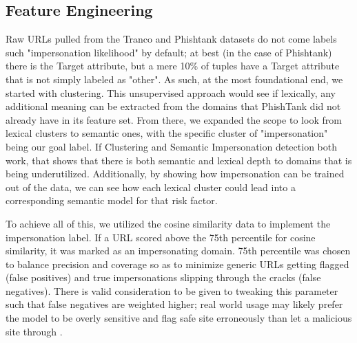 \documentclass[conference]{IEEEtran}
\begin{document}
\subsection{Feature Engineering}
Raw URLs pulled from the Tranco and Phishtank datasets do not come labels such "impersonation likelihood" by default; at best (in the case of Phishtank) there is the Target attribute, but a mere 10\% of tuples have a Target attribute that is not simply labeled as "other". 
As such, at the most foundational end, we started with clustering. This unsupervised approach would see if lexically, any additional meaning can be extracted from the domains that PhishTank did not already have in its feature set.
From there, we expanded the scope to look from lexical clusters to semantic ones, with the specific cluster of "impersonation" being our goal label. If Clustering and Semantic Impersonation detection both work, that shows that there is both semantic and lexical depth to domains that is being underutilized. Additionally, by showing how impersonation can be trained out of the data, we can see how each lexical cluster could lead into a corresponding semantic model for that risk factor.

To achieve all of this, we utilized the cosine similarity data to implement the impersonation label. 
If a URL scored above the 75th percentile for cosine similarity, it was marked as an impersonating domain.
75th percentile was chosen to balance precision and coverage so as to minimize generic URLs getting flagged (false positives) and true impersonations slipping through the cracks (false negatives).
There is valid consideration to be given to tweaking this parameter such that false negatives are weighted higher;  real world usage may likely prefer the model to be overly sensitive and flag safe site erroneously than let a malicious site through \cite{sonowal1}.
\end{document}
